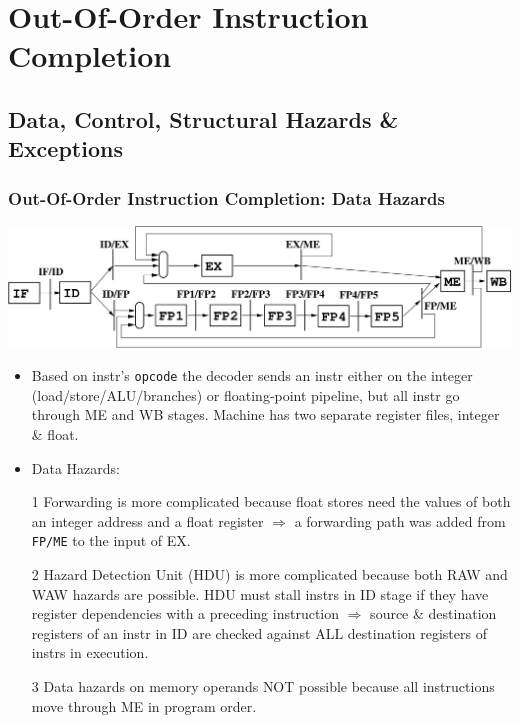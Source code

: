 \documentclass{beamer}
\renewcommand{\emph}[1]{\textcolor{structure}{#1}}
\newcommand{\emp}[1]{\textcolor{DikuRed}{ #1}}
\begin{document}
\section{Out-Of-Order Instruction Completion}

\begin{frame}[fragile]
	\tableofcontents[currentsection]
\end{frame}

\subsection{Data, Control, Structural Hazards \& Exceptions}

\begin{frame}[fragile,t]
\frametitle{Out-Of-Order Instruction Completion: Data Hazards}

\includegraphics[width=59ex]{Figures/SimpleOoOPipeline}

\bigskip

\begin{scriptsize}
\begin{itemize}
\item Based on instr's {\tt opcode} the decoder sends an instr
        either on the integer (load/store/ALU/branches) or 
        floating-point pipeline,
        but all instr go through ME and WB stages.
        Machine has two separate register files, integer \& float.\bigskip

\item \emp{Data Hazards:} 
\item[1] \emp{Forwarding is more complicated} because float stores need the
            values of both an integer address and a float register $\Rightarrow$
            \emph{a forwarding path was added from {\tt FP/ME} to the
                    input of EX}.\smallskip
\item[2] \emp{Hazard Detection Unit (HDU) is more complicated} because both RAW and WAW
            hazards are possible. HDU must stall instrs in ID stage if they
            have register dependencies with a preceding instruction 
            $\Rightarrow$ \emph{source \& destination registers 
            of an instr in ID are checked against ALL destination registers
            of instrs in execution}.\smallskip
\item[3] Data hazards on memory operands \emph{NOT possible} because all
                instructions move through ME in program order.
\end{itemize}
\end{scriptsize}
\end{frame}
\end{document}
